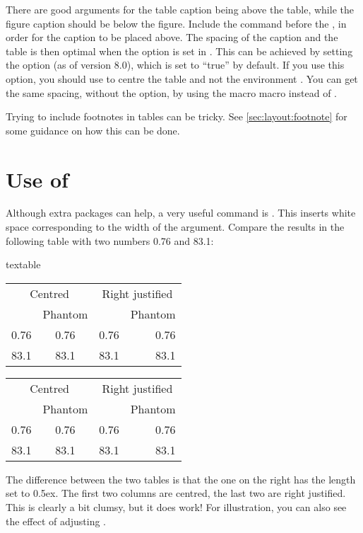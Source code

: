 There are good arguments for the table caption being above the table,
while the figure caption should be below the figure.
Include the  command before the ,
in order for the caption to be placed above.
The spacing of the caption and the table is then optimal
when the option 
is set in \KOMAScript.
This can be achieved by setting the option  (as of version 8.0), which is set to \enquote{true} by default.
If you use this option, you should use  to centre the table
and not the environment .
You can get the same spacing, without the  option,
by using the macro  macro instead of .

Trying to include footnotes in tables can be tricky.
See \cref{sec:layout:footnote} for some guidance on how this can be done.


\section{Use of \texorpdfstring{}{phantom}}%
\label{sec:table:phantom}

Although extra packages can help, a very useful command is
. This inserts white space corresponding to the width
of the argument. Compare the results in the following table with two
numbers 0.76 and 83.1:

\begin{tcblisting}{textable}
\centering
\begin{tabular}{cc|rr}
  \multicolumn{2}{c|}{Centred} &
  \multicolumn{2}{c}{Right justified} \\
  & Phantom & & Phantom\\
  \midrule
  0.76 & \phantom{0}0.76 & 0.76 & 0.76\\
  83.1 & 83.1\phantom{0} & 83.1 & 83.1\phantom{0}
\end{tabular}
\qquad
{\setlength{\extrarowheight}{0.5ex}
\centering
\begin{tabular}{cc|rr}
  \multicolumn{2}{c|}{Centred} &
  \multicolumn{2}{c}{Right justified} \\
  & Phantom & & Phantom\\
  \midrule
  0.76 & \phantom{0}0.76 & 0.76 & 0.76\\
  83.1 & 83.1\phantom{0} & 83.1 & 83.1\phantom{0}
\end{tabular}
}
\end{tcblisting}
\par\noindent
The difference between the two tables is that the one on the right
has the length  set to 0.5ex.
The first two columns are centred, the last two are right justified.
This is clearly a bit clumsy, but it does work!
For illustration, you can also see the effect of adjusting .



